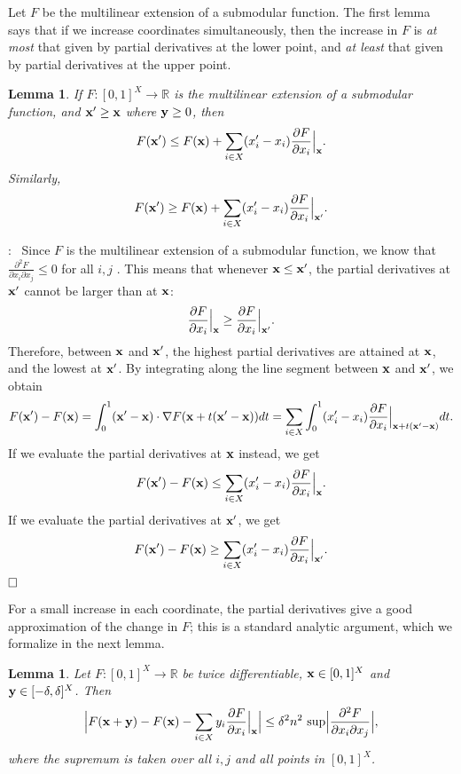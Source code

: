 \documentclass{article}[11pt]
\newtheorem{lemma}[theorem]{Lemma}
\newcommand{\partdiff}[2]{\frac{\partial {#1}}{\partial {#2}}}
\newcommand{\mixdiff}[3]{\frac{\partial^2 {#1}}{{\partial {#2}}{\partial {#3}}}}
\renewenvironment{proof}{\noindent{\bf Proof}:~}{$\hfill \Box$\\}
\def\bx{{\bf x}}
\def\by{{\bf y}}
\def\RR{{\mathbb R}}
\def\sup{{\rm{sup}}}
\begin{document}
Let $F$ be the multilinear extension of a submodular function.
The first lemma says that if we increase coordinates simultaneously, then the increase
in $F$ is {\em at most} that given by partial derivatives at the lower point,
and {\em at least} that given by partial derivatives at the upper point.

\begin{lemma}
\label{lem:submod-change}
If $F:[0,1]^X \rightarrow \RR$ is the multilinear extension of a submodular function,
and $\bx' \geq \bx$ where $\by \geq 0$, then
$$ F(\bx') \leq F(\bx) + \sum_{i \in X} (x'_i - x_i) \partdiff{F}{x_i} \Big|_\bx.$$
Similarly,
$$ F(\bx') \geq F(\bx) + \sum_{i \in X} (x'_i - x_i) \partdiff{F}{x_i} \Big|_{\bx'}.$$
\end{lemma}

\begin{proof}
Since $F$ is the multilinear extension of a submodular function,
we know that $\mixdiff{F}{x_i}{x_j} \leq 0$ for all $i,j$ \cite{CCPV07}.
This means that whenever $\bx \leq \bx'$, the partial derivatives
at $\bx'$ cannot be larger than at $\bx$:
$$ \partdiff{F}{x_i} \Big|_{\bx} \geq \partdiff{F}{x_i} \Big|_{\bx'}. $$
Therefore, between $\bx$ and $\bx'$, the highest partial derivatives
are attained at $\bx$, and the lowest at $\bx'$.
By integrating along the line segment between $\bx$ and $\bx'$, we obtain
$$ F(\bx') - F(\bx) = \int_0^1 (\bx'-\bx) \cdot \nabla F(\bx + t (\bx'-\bx)) dt
 = \sum_{i \in X} \int_0^1 (x'_i-x_i) \partdiff{F}{x_i} \Big|_{\bx + t (\bx'-\bx)} dt.$$
If we evaluate the partial derivatives at $\bx$ instead, we get
$$ F(\bx') - F(\bx) \leq \sum_{i \in X} (x'_i - x_i) \partdiff{F}{x_i} \Big|_\bx.$$
If we evaluate the partial derivatives at $\bx'$, we get
$$ F(\bx') - F(\bx) \geq \sum_{i \in X} (x'_i - x_i) \partdiff{F}{x_i} \Big|_{\bx'}.$$
\end{proof}

For a small increase in each coordinate, the partial derivatives give
a good approximation of the change in $F$; this is a standard analytic argument,
which we formalize in the next lemma.

\begin{lemma}
\label{lem:Taylor}
Let $F:[0,1]^X \rightarrow \RR$ be twice differentiable,
$\bx \in [0,1]^X$ and $\by \in [-\delta,\delta]^X$. Then
$$ \Big|F(\bx+\by) - F(\bx) - \sum_{i \in X} y_i \partdiff{F}{x_i} \Big|_\bx \Big|
 \leq \delta^2 n^2 \ \sup \Big| \mixdiff{F}{x_i}{x_j} \Big|,$$
 where the supremum is taken over all $i,j$ and all points in $[0,1]^X$.
\end{lemma}
\end{document}
